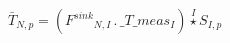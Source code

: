 \documentclass[border=2pt]{standalone}
\begin{document}
${{\bar{T}}}{_{N, p}}=\left({{F^{sink}}}{_{N, I}} \, . \, {\_T\_meas}{_{I}}\right) \stackrel{I}{\star} {{S}}{_{I, p}}$
\end{document}
